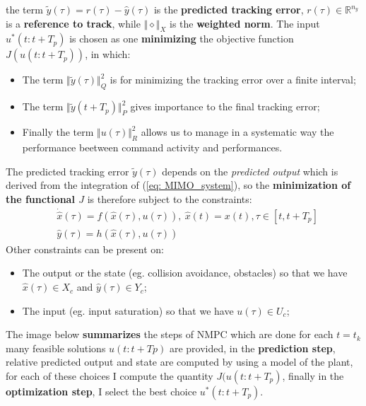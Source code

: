 the term $\tilde{y}(\tau)=r(\tau)-\hat{y}(\tau)$ is the \textbf{predicted tracking error}, $r(\tau)\in\mathbb{R}^{n_y}$ is a \textbf{reference to track}, while $\Vert \diamond \Vert_X$ is the \textbf{weighted norm}. The input $u^*(t:t+T_p)$ is chosen as one \textbf{minimizing} the objective function $J(u(t:t+T_p))$, in which:
\begin{itemize}
    \item The term $\Vert \tilde{y}(\tau) \Vert_Q^2$ is for minimizing the tracking error over a finite interval; 
    \item The term $\Vert \tilde{y}(t+T_p) \Vert_P^2$ gives importance to the final tracking error; 
    \item Finally the term $\Vert u(\tau) \Vert_R^2$ allows us to manage in a systematic way the performance beetween command activity and performances. 
\end{itemize}

The predicted tracking error $\tilde{y}(\tau)$ depends on the \textit{predicted output} which is derived from the integration of (\ref{eq: MIMO_system}), so the \textbf{minimization of the functional $J$} is therefore subject to the constraints:
\begin{align*}
    &\dot{\hat{x}}(\tau)=f(\hat{x}(\tau), u(\tau)), \ \hat{x}(t)=x(t), \tau\in[t, t+T_p]\\
    &\hat{y}(\tau)=h(\hat{x}(\tau), u(\tau)) 
\end{align*}
Other constraints can be present on:
\begin{itemize}
    \item The output or the state (eg. collision avoidance, obstacles) so that we have $\hat{x}(\tau) \in X_c$ and $\hat{y}(\tau)\in Y_c$; 
    \item The input (eg. input saturation) so that we have $u(\tau) \in U_c$;
\end{itemize}
The image below \textbf{summarizes} the steps of NMPC which are done for each $t=t_k$ many feasible solutions {\color{blue} $u(t:t+Tp)$} are provided, in the \textbf{prediction step}, relative predicted output and state are computed by using a model of the plant, for each of these choices I compute the quantity $J(u(t:t+T_p)$, finally in the \textbf{optimization step}, I select the best choice {\color{red} $u^*(t:t+T_p)$}. 

